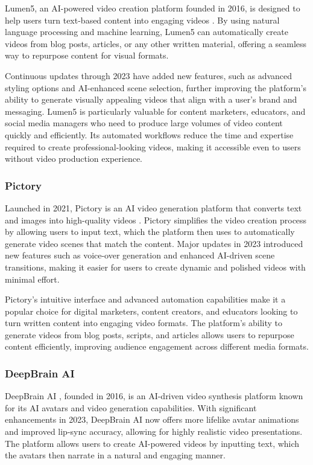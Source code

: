 Lumen5, an AI-powered video creation platform founded in 2016, is designed to help users turn text-based content into engaging videos \cite{volaric2024artificial}. 
By using natural language processing and machine learning, Lumen5 can automatically create videos from blog posts, articles, or any other written material, offering a seamless way to repurpose content for visual formats.

Continuous updates through 2023 have added new features, such as advanced styling options and AI-enhanced scene selection, further improving the platform's ability to generate visually appealing videos that align with a user's brand and messaging. 
Lumen5 is particularly valuable for content marketers, educators, and social media managers who need to produce large volumes of video content quickly and efficiently. 
Its automated workflows reduce the time and expertise required to create professional-looking videos, making it accessible even to users without video production experience.

\subsubsection{Pictory}

Launched in 2021, Pictory is an AI video generation platform that converts text and images into high-quality videos \cite{cho2024sora}. 
Pictory simplifies the video creation process by allowing users to input text, which the platform then uses to automatically generate video scenes that match the content. 
Major updates in 2023 introduced new features such as voice-over generation and enhanced AI-driven scene transitions, making it easier for users to create dynamic and polished videos with minimal effort.

Pictory's intuitive interface and advanced automation capabilities make it a popular choice for digital marketers, content creators, and educators looking to turn written content into engaging video formats. 
The platform's ability to generate videos from blog posts, scripts, and articles allows users to repurpose content efficiently, improving audience engagement across different media formats.

\subsubsection{DeepBrain AI}

DeepBrain AI \cite{churchill2018china}, founded in 2016, is an AI-driven video synthesis platform known for its AI avatars and video generation capabilities. 
With significant enhancements in 2023, DeepBrain AI now offers more lifelike avatar animations and improved lip-sync accuracy, allowing for highly realistic video presentations. 
The platform allows users to create AI-powered videos by inputting text, which the avatars then narrate in a natural and engaging manner.

